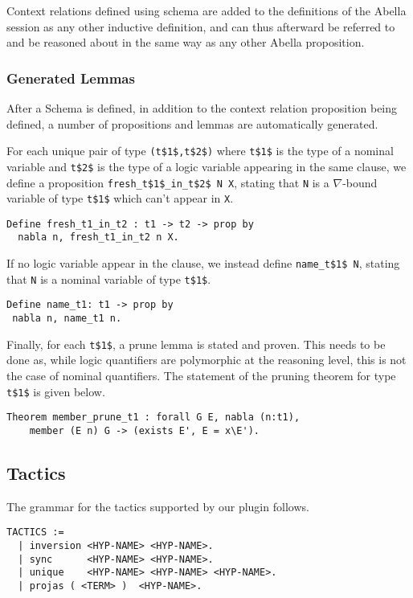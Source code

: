 \documentclass[nocopyrightspace,authoryear]{sigplanconf}
\begin{document}
Context relations defined using schema are added to the definitions of the Abella session as any other inductive definition, and can thus afterward be referred to and be reasoned about in the same way as any other Abella proposition.

\subsubsection{Generated Lemmas}

After a Schema is defined, in addition to the context relation proposition being defined, a number of propositions and lemmas are automatically generated.

For each unique pair of type \lstinline|(t$1$,t$2$)| where \lstinline|t$1$| is the type of a nominal variable and \lstinline|t$2$| is the type of a logic variable appearing in the same clause, we define a proposition \lstinline|fresh_t$1$_in_t$2$ N X|, stating that \lstinline|N| is a $\nabla$-bound variable of type \lstinline|t$1$| which can't appear in \lstinline|X|.

\begin{lstlisting}
Define fresh_t1_in_t2 : t1 -> t2 -> prop by
  nabla n, fresh_t1_in_t2 n X.
\end{lstlisting}

If no logic variable appear in the clause, we instead define \lstinline|name_t$1$ N|, stating that \lstinline|N| is a nominal variable of type \lstinline|t$1$|.

\begin{lstlisting}
Define name_t1: t1 -> prop by
 nabla n, name_t1 n.
\end{lstlisting}

Finally, for each \lstinline|t$1$|, a prune lemma is stated and proven. This needs to be done as, while logic quantifiers are polymorphic at the reasoning level, this is not the case of nominal quantifiers. The statement of the pruning theorem for type \lstinline|t$1$| is given below.
\begin{lstlisting}
Theorem member_prune_t1 : forall G E, nabla (n:t1), 
    member (E n) G -> (exists E', E = x\E').
\end{lstlisting}

\subsection{Tactics}
The grammar for the tactics supported by our plugin follows.
\begin{lstlisting}
TACTICS :=
  | inversion <HYP-NAME> <HYP-NAME>.
  | sync      <HYP-NAME> <HYP-NAME>.
  | unique    <HYP-NAME> <HYP-NAME> <HYP-NAME>.
  | projas ( <TERM> )  <HYP-NAME>.
\end{lstlisting}
\end{document}
